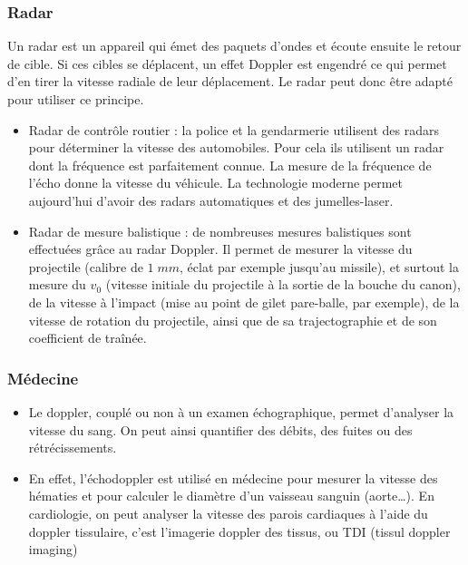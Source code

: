 \documentclass[11pt,a4paper]{article}
\begin{document}
\subsubsection*{Radar}
Un radar est un appareil qui émet des paquets d’ondes et écoute ensuite le retour de cible. Si ces cibles se déplacent, un effet Doppler est engendré ce qui permet d’en tirer la vitesse radiale de leur déplacement. Le radar peut donc être adapté pour utiliser ce principe.
\begin{itemize}
    \item Radar de contrôle routier : la police et la gendarmerie utilisent des radars pour déterminer la vitesse des automobiles. Pour cela ils utilisent un radar dont la fréquence est parfaitement connue. La mesure de la fréquence de l’écho donne la vitesse du véhicule. La technologie moderne permet aujourd’hui d’avoir des radars automatiques et des jumelles-laser.
	\item Radar de mesure balistique : de nombreuses mesures balistiques sont effectuées grâce au radar Doppler. Il permet de mesurer la vitesse du projectile (calibre de $1\; mm$, éclat par exemple jusqu’au missile), et surtout la mesure du $v_0$ (vitesse initiale du projectile à la sortie de la bouche du canon), de la vitesse à l’impact (mise au point de gilet pare-balle, par exemple), de la vitesse de rotation du projectile, ainsi que de sa trajectographie et de son coefficient de traînée. 
\end{itemize}
	
\subsubsection*{Médecine}
\begin{itemize}
    \item Le doppler, couplé ou non à un examen échographique, permet d’analyser la vitesse du sang. On peut ainsi quantifier des débits, des fuites ou des rétrécissements.
    \item En effet, l’échodoppler est utilisé en médecine pour mesurer la vitesse des hématies et pour calculer le diamètre d’un vaisseau sanguin (aorte…).
	En cardiologie, on peut analyser la vitesse des parois cardiaques à l’aide du doppler tissulaire, c’est l’imagerie doppler des tissus, ou TDI (tissul doppler imaging)
\end{itemize}
\end{document}
